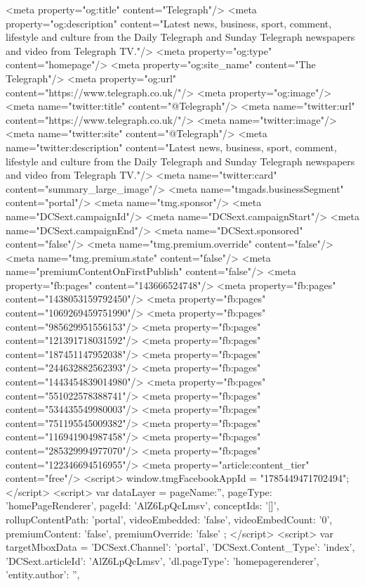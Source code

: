 {{{	
<meta property="og:title" content="Telegraph"/>
<meta property="og:description" content="Latest news, business, sport, comment, lifestyle and culture from the Daily Telegraph and Sunday Telegraph newspapers and video from Telegraph TV."/>
<meta property="og:type" content="homepage"/>
<meta property="og:site_name" content="The Telegraph"/>
<meta property="og:url" content="https://www.telegraph.co.uk/"/>
<meta property="og:image"/>
<meta name="twitter:title" content="@Telegraph"/>
<meta name="twitter:url" content="https://www.telegraph.co.uk/"/>
<meta name="twitter:image"/>
<meta name="twitter:site" content="@Telegraph"/>
<meta name="twitter:description" content="Latest news, business, sport, comment, lifestyle and culture from the Daily Telegraph and Sunday Telegraph newspapers and video from Telegraph TV."/>
<meta name="twitter:card" content="summary_large_image"/>
<meta name="tmgads.businessSegment" content="portal"/>
<meta name="tmg.sponsor"/>
<meta name="DCSext.campaignId"/>
<meta name="DCSext.campaignStart"/>
<meta name="DCSext.campaignEnd"/>
<meta name="DCSext.sponsored" content="false"/>
<meta name="tmg.premium.override" content="false"/>
<meta name="tmg.premium.state" content="false"/>
<meta name="premiumContentOnFirstPublish" content="false"/>
<meta property="fb:pages" content="143666524748"/>
<meta property="fb:pages" content="1438053159792450"/>
<meta property="fb:pages" content="1069269459751990"/>
<meta property="fb:pages" content="985629951556153"/>
<meta property="fb:pages" content="121391718031592"/>
<meta property="fb:pages" content="187451147952038"/>
<meta property="fb:pages" content="244632882562393"/>
<meta property="fb:pages" content="1443454839014980"/>
<meta property="fb:pages" content="551022578388741"/>
<meta property="fb:pages" content="534435549980003"/>
<meta property="fb:pages" content="751195545009382"/>
<meta property="fb:pages" content="116941904987458"/>
<meta property="fb:pages" content="285329994977070"/>
<meta property="fb:pages" content="122346694516955"/>
<meta property="article:content_tier" content="free"/>
<script>
	window.tmgFacebookAppId = "1785449471702494";
</script>
<script>
	var dataLayer = {
		pageName:'',
		pageType: 'homePageRenderer',
		pageId: 'AlZ6LpQcLmsv',
		conceptIds: '[]',
		rollupContentPath: 'portal',
		videoEmbedded: 'false',
		videoEmbedCount: '0',
		premiumContent: 'false',
		premiumOverride: 'false'
	};
</script>
<script>
	var targetMboxData = {
		'DCSext.Channel': 'portal',
		'DCSext.Content_Type': 'index',
		'DCSext.articleId': 'AlZ6LpQcLmsv',
		'dl.pageType': 'homepagerenderer',
		'entity.author': '',
}}}}
